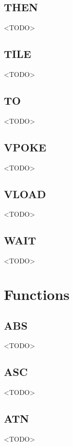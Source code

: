 \subsection{THEN}

<TODO>

\subsection{TILE}

<TODO>

\subsection{TO}

<TODO>

\subsection{VPOKE}

<TODO>

\subsection{VLOAD}

<TODO>

\subsection{WAIT}

<TODO>

\section{Functions}

\subsection{ABS}

<TODO>

\subsection{ASC}

<TODO>

\subsection{ATN}

<TODO>

